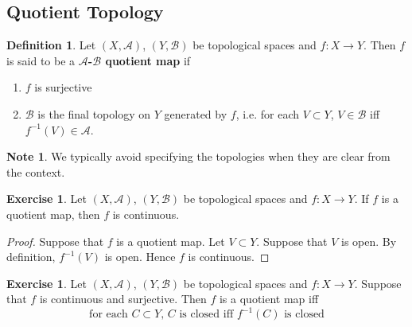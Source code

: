 \documentclass[12pt]{amsart}
\theoremstyle{definition}
\newtheorem{defn}[definition]{Definition}
\newtheorem{note}[definition]{Note}
\newtheorem{ex}[definition]{Exercise}
\newcommand{\MA}{\mathcal{A}}
\newcommand{\MB}{\mathcal{B}}
\newcommand{\tbf}[1]{\textbf{#1}}
\DeclareMathOperator*{\0}{\mbf{0}}
\DeclareMathOperator*{\1}{\mbf{1}}
\newcommand{\lex}[1]{\label{ex:#1}}
\newcommand{\ld}[1]{\label{defn:#1}}
\begin{document}
	
	
	
	
	
	
	
	
	\newpage
	\subsection{Quotient Topology}
	
	\begin{defn} \ld{34001}
	Let $(X, \MA)$, $(Y, \MB)$ be topological spaces and $f:X \rightarrow Y$. Then $f$ is said to be a \tbf{$\MA$-$\MB$ quotient map} if 
	\begin{enumerate}
	\item $f$ is surjective
	\item $\MB$ is the final topology on $Y$ generated by $f$, i.e. for each $V \subset Y$, $V \in \MB$ iff $f^{-1}(V) \in \MA$.
	\end{enumerate}
	\end{defn}
	
	\begin{note}
	We typically avoid specifying the topologies when they are clear from the context.
	\end{note}
	
	\begin{ex} \lex{34002}
	Let $(X, \MA)$, $(Y, \MB)$ be topological spaces and $f:X \rightarrow Y$. If $f$ is a quotient map, then $f$ is continuous.
	\end{ex}
	
	\begin{proof}
	Suppose that $f$ is a quotient map. Let $V \subset Y$. Suppose that $V$ is open. By definition, $f^{-1}(V)$ is open. Hence $f$ is continuous.  
	\end{proof}
	
	\begin{ex} \lex{34003}
	Let $(X, \MA)$, $(Y, \MB)$ be topological spaces and $f:X \rightarrow Y$. Suppose that $f$ is continuous and surjective. Then $f$ is a quotient map iff 
	\begin{equation*}
	\text{for each $C \subset Y$, $C$ is closed iff $f^{-1}(C)$ is closed} 
	\end{equation*}	
	\end{ex}
	
\end{document}
